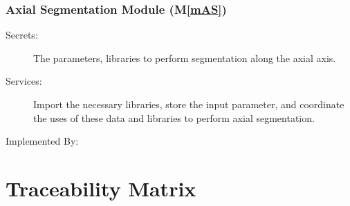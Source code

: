 \documentclass[12pt, titlepage]{article}
\newcounter{mnum}
\newcommand{\mthemnum}{M\themnum}
\newcommand{\mref}[1]{M\ref{#1}}
\begin{document}

\subsubsection{Axial Segmentation Module (\mref{mAS})}
\begin{description}
\item[Secrets:] The parameters, libraries to perform segmentation along the axial axis.
\item[Services:] Import the necessary libraries, store the input parameter, and coordinate the uses of these data and libraries to perform axial segmentation.
\item[Implemented By:] \progname
\end{description}


\section{Traceability Matrix} \label{SecTM}

\end{document}
